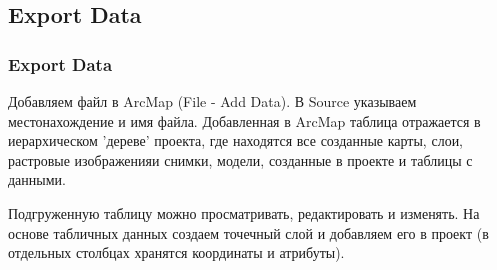 \documentclass[pdflatex,compress,8pt,
	xcolor={dvipsnames,dvipsnames,svgnames,x11names,table},
	hyperref={	 
	pdfauthor={Lemenkova Polina}, 
	pdfsubject={Preentation}, 
	pdfcreator={Lemenkova Polina}, 
	pdfproducer={Lemenkova Polina}, 
	colorlinks=true,
	linkcolor=Red3, 
	citecolor=NavyBlue, 
	urlcolor = NavyBlue, 
	breaklinks = true}]{beamer}
\begin{document}
\subsection{Export Data}
\begin{frame}\frametitle{Export Data}

\begin{alertblock}{}
Добавляем файл в ArcMap (File - Add Data). В Source указываем местонахождение и имя файла. Добавленная в ArcMap таблица отражается в иерархическом 'дереве' проекта, где находятся все созданные карты, слои, растровые изображенияи снимки, модели, созданные в проекте и таблицы с данными.
\end{alertblock}

\begin{figure}[H]
	\centering
			\hspace{1mm}
			\hspace{1mm}
\end{figure}

\begin{block}{}
Подгруженную таблицу можно просматривать, редактировать и изменять. На основе табличных данных 
создаем точечный слой и добавляем его в проект (в отдельных столбцах хранятся координаты и атрибуты).
\end{block}

\end{frame}
\end{document}
